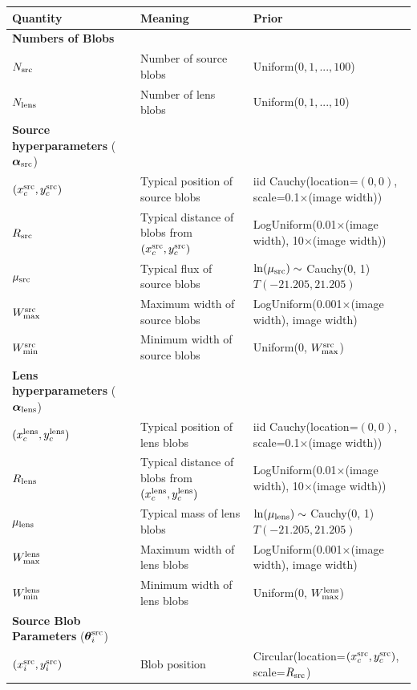 \documentclass[useAMS,usenatbib]{mn2e}
\begin{document}
\begin{table}
\begin{tabular}{|l|l|l|}
\hline
Quantity	&	Meaning		& Prior\\
\hline
{\bf Numbers of Blobs}\\
\hline
$N_{\rm src}$	&	Number of source blobs	& Uniform($0, 1, ..., 100$)\\
$N_{\rm lens}$	&	Number of lens blobs	& Uniform($0, 1, ..., 10$)\\
\hline
{\bf Source hyperparameters} ($\boldsymbol{\alpha}_{\rm src}$)\\
\hline
$(x_c^{\rm src}, y_c^{\rm src})$ & Typical position of source blobs & iid Cauchy(location=$(0,0)$, scale=0.1$\times$(image width))\\
$R_{\rm src}$   &	Typical distance of blobs from $(x_c^{\rm src}, y_c^{\rm src})$ & LogUniform(0.01$\times$(image width), 10$\times$(image width))\\
$\mu_{\rm src}$ &	Typical flux of source blobs	& $\ln(\mu_{\rm src}) \sim$ Cauchy(0, 1)$T(-21.205, 21.205)$\\
$W_{\rm max}^{\rm src}$ &		Maximum width of source blobs	& LogUniform(0.001$\times$(image width), image width)\\
$W_{\rm min}^{\rm src}$ &		Minimum width of source blobs	& Uniform(0, $W_{\rm max}^{\rm src}$)\\
\hline
{\bf Lens hyperparameters} ($\boldsymbol{\alpha}_{\rm lens}$)\\
\hline
$(x_c^{\rm lens}, y_c^{\rm lens})$ & Typical position of lens blobs & iid Cauchy(location=$(0,0)$, scale=0.1$\times$(image width))\\
$R_{\rm lens}$  &	Typical distance of blobs from $(x_c^{\rm lens}, y_c^{\rm lens})$ 	& LogUniform(0.01$\times$(image width), 10$\times$(image width))\\
$\mu_{\rm lens}$&	Typical mass of lens blobs	& $\ln(\mu_{\rm lens}) \sim$ Cauchy(0, 1)$T(-21.205, 21.205)$\\
$W_{\rm max}^{\rm lens}$ &		Maximum width of lens blobs	& LogUniform(0.001$\times$(image width), image width)\\
$W_{\rm min}^{\rm lens}$ &		Minimum width of lens blobs	& Uniform(0, $W_{\rm max}^{\rm lens}$)\\
\hline
{\bf Source Blob Parameters} ($\boldsymbol{\theta}_i^{\rm src}$)\\
\hline
$(x_i^{\rm src}, y_i^{\rm src})$ & Blob position & Circular(location=$(x_c^{\rm src}, y_c^{\rm src})$, scale=$R_{\rm src}$)\\

\end{tabular}
\end{table}
\end{document}
